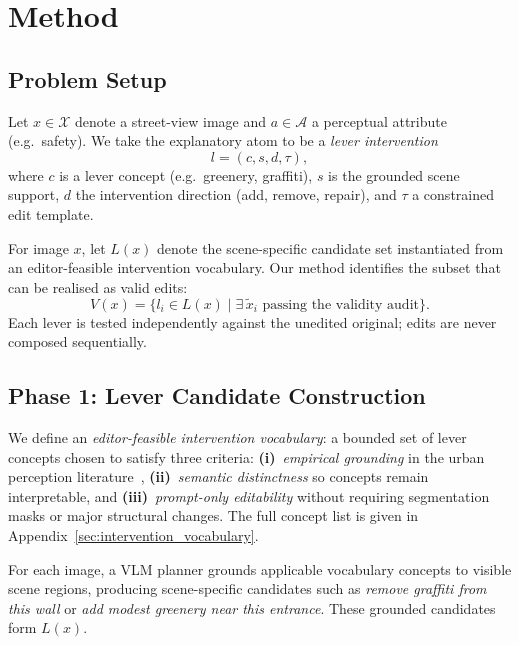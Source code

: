 \section{Method}
\label{sec:method}

\subsection{Problem Setup}

Let $x \in \mathcal{X}$ denote a street-view image and
$a \in \mathcal{A}$ a perceptual attribute (e.g.\ safety). We take the
explanatory atom to be a \emph{lever intervention}
\begin{equation}
  l = (c, s, d, \tau),
\end{equation}
where $c$ is a lever concept (e.g.\ greenery, graffiti), $s$ is the
grounded scene support, $d$ the intervention direction (add, remove,
repair), and $\tau$ a constrained edit template.

For image $x$, let $L(x)$ denote the scene-specific candidate set
instantiated from an editor-feasible intervention vocabulary. Our method identifies the
subset that can be realised as valid edits:
\begin{equation}
  V(x) = \{ l_i \in L(x) \mid \exists\, \tilde{x}_i \text{ passing the validity audit} \}.
\end{equation}
Each lever is tested independently against the unedited original; edits
are never composed sequentially.

\subsection{Phase 1: Lever Candidate Construction}

We define an \emph{editor-feasible intervention vocabulary}: a bounded
set of lever concepts chosen to satisfy three criteria:
\textbf{(i)}~\emph{empirical grounding} in the urban perception
literature~\cite{jacobs1961,newman1972,li2015greenery,jiang2018brokenwindows,portnov2020lighting},
\textbf{(ii)}~\emph{semantic distinctness} so concepts remain
interpretable, and \textbf{(iii)}~\emph{prompt-only editability}
without requiring segmentation masks or major structural changes.
The full concept list is given in Appendix~\ref{sec:intervention_vocabulary}.

For each image, a VLM planner grounds applicable vocabulary concepts to
visible scene regions, producing scene-specific candidates such as
\emph{remove graffiti from this wall} or \emph{add modest greenery near
this entrance}. These grounded candidates form $L(x)$.

